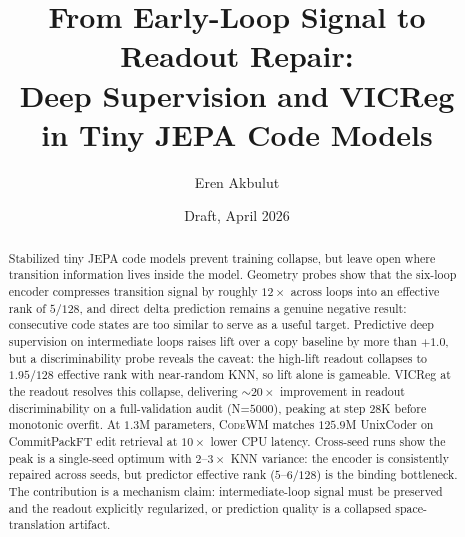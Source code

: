 \documentclass[11pt]{article}
\title{From Early-Loop Signal to Readout Repair:\\
       Deep Supervision and VICReg\\
       in Tiny JEPA Code Models}
\author{Eren Akbulut}
\date{Draft, April 2026}
\newcommand{\CodeWM}{\textsc{CodeWM}}
\begin{document}
\maketitle

\begin{abstract}
Stabilized tiny JEPA code models prevent training collapse, but leave
open where transition information lives inside the model.  Geometry
probes show that the six-loop encoder compresses transition signal by
roughly $12\times$ across loops into an effective rank of $5/128$, and
direct delta prediction remains a genuine negative result:
consecutive code states are too similar to serve as a useful target.
Predictive deep supervision on intermediate loops raises lift over a
copy baseline by more than $+1.0$, but a discriminability probe
reveals the caveat: the high-lift readout collapses to $1.95/128$
effective rank with near-random KNN, so lift alone is gameable.
VICReg at the readout resolves this collapse, delivering
$\sim\!20\times$ improvement in readout discriminability on a
full-validation audit (N=$5000$), peaking at step 28K before monotonic
overfit.  At $1.3$M parameters, \CodeWM{} matches $125.9$M UnixCoder
on CommitPackFT edit retrieval at $10\times$ lower CPU latency.
Cross-seed runs show the peak is a single-seed optimum with
$2\text{--}3\times$ KNN variance: the encoder is consistently
repaired across seeds, but predictor effective rank
($5\text{--}6/128$) is the binding bottleneck.  The contribution is a
mechanism claim: intermediate-loop signal must be preserved and the
readout explicitly regularized, or prediction quality is a collapsed
space-translation artifact.
\end{abstract}













\appendix




\end{document}
